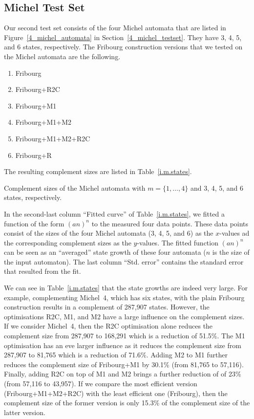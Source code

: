 \subsection{Michel Test Set}
\label{5_internal_michel}
Our second test set consists of the four Michel automata that are listed in Figure~\ref{4_michel_automata} in Section~\ref{4_michel_testset}. They have 3, 4, 5, and 6 states, respectively. The Fribourg construction versions that we tested on the Michel automata are the following.
\begin{enumerate}
\item Fribourg
\item Fribourg+R2C
\item Fribourg+M1
\item Fribourg+M1+M2
\item Fribourg+M1+M2+R2C
\item Fribourg+R
\end{enumerate}

The resulting complement sizes are listed in Table~\ref{i.m.states}.

\begin{table}[htb]
\centering

\caption{Complement sizes of the Michel automata with $m=\{1,\dots,4\}$ and 3, 4, 5, and 6 states, respectively. }
\label{i.m.states}
\end{table}

In the second-last column ``Fitted curve'' of Table~\ref{i.m.states}, we fitted a function of the form $(an)^n$ to the measured four data points. These data points consist of the sizes of the four Michel automata (3, 4, 5, and 6) as the $x$-values ad the corresponding complement sizes as the $y$-values. The fitted function $(an)^n$ can be seen as an ``averaged'' state growth of these four automata ($n$ is the size of the input automaton). The last column ``Std. error'' contains the standard error that resulted from the fit.

We can see in Table~\ref{i.m.states} that the state growths are indeed very large. For example, complementing Michel~4, which has six states, with the plain Fribourg construction results in a complement of 287,907 states. However, the optimisations R2C, M1, and M2 have a large influence on the complement sizes. If we consider Michel~4, then the R2C optimisation alone reduces the complement size from 287,907 to 168,291 which is a reduction of 51.5\%. The M1 optimisation has an eve larger influence as it reduces the complement size from 287,907 to 81,765 which is a reduction of 71.6\%. Adding M2 to M1 further reduces the complement size of Fribourg+M1 by 30.1\% (from 81,765 to 57,116). Finally, adding R2C on top of M1 and M2 brings a further reduction of of 23\% (from 57,116 to 43,957). If we compare the most efficient version (Fribourg+M1+M2+R2C) with the least efficient one (Fribourg), then the complement size of the former version is only 15.3\% of the complement size of the latter version.


